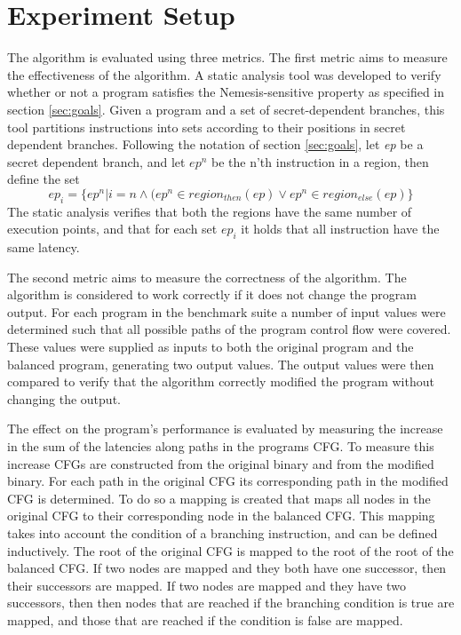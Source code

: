 \section{Experiment Setup}
\label{sec:setup}
The algorithm is evaluated using three metrics. The first metric aims to measure the effectiveness of the algorithm. A static analysis tool was developed to verify 
whether or not a program satisfies the Nemesis-sensitive property as specified in section \ref{sec:goals}.
Given a program and a set of secret-dependent branches, this tool partitions instructions into sets according to their positions in secret dependent branches. Following the notation of section \ref{sec:goals}, let \textit{ep} be a secret dependent branch, and let $ep^n$ be the n'th instruction in a region, then define the set 
\begin{equation} \label{eq:toolSets}
    ep_i = \{ ep^n |i = n \land  (ep^n \in region_{then}(ep) \lor ep^n \in region_{else}(ep)\}
\end{equation}
The static analysis verifies that both the regions have the same number of execution points, and that for each set $ep_i$ it holds that all 
instruction have the same latency.

The second metric aims to measure the correctness of the algorithm. The algorithm is considered to work correctly if it does not change the program output. For each program in the benchmark suite a number of input values were determined such that all possible paths of the program control flow were covered.
These values were supplied as inputs to both the original program and the balanced program, generating two output values. The output values were then compared to 
verify that the algorithm correctly modified the program without changing the output. 

The effect on the program's performance is evaluated by measuring the increase in the sum of the latencies along paths in the programs CFG. 
To measure this increase CFGs are constructed from the original binary and from the modified binary. 
For each path in the original CFG its corresponding path in the modified CFG is determined. To do so a mapping is created that maps all nodes in the original CFG to their corresponding node in the balanced CFG. 
This mapping takes into account the condition of a branching instruction, and can be defined inductively. 
The root of the original CFG is mapped to the root of the root of the balanced CFG. 
If two nodes are mapped and they both have one successor, then their successors are mapped. 
If two nodes are mapped and they have two successors, then then nodes that are reached if the branching condition is true are mapped,
and those that are reached if the condition is false are mapped.

